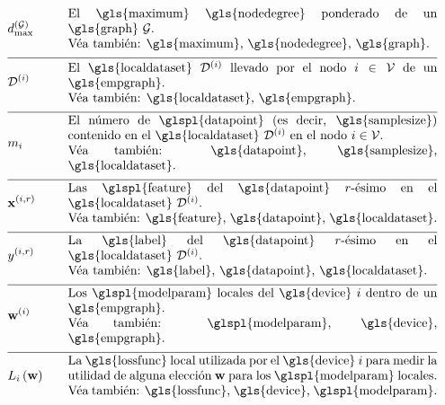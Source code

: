 \begin{align} 
   &\maxnodedegree^{(\graph)} & \quad & \parbox{.85\textwidth}{El \gls{maximum} \gls{nodedegree} ponderado de un \gls{graph} $\graph$.
	   \\ Véa también: \gls{maximum}, \gls{nodedegree}, \gls{graph}.} \nonumber \\[2mm] \hline \nonumber\\[-5mm] 
   &\localdataset{\nodeidx} & \quad & \parbox{.85\textwidth}{El \gls{localdataset} $\localdataset{\nodeidx}$ llevado por 
	   el nodo $\nodeidx\in \nodes$ de un \gls{empgraph}.
	   \\ Véa también: \gls{localdataset}, \gls{empgraph}.} \nonumber \\[2mm] \hline \nonumber\\[-5mm]
   &\localsamplesize{\nodeidx} & \quad & \parbox{.85\textwidth}{El número de \glspl{datapoint} (es decir, \gls{samplesize}) contenido en el 
	   \gls{localdataset} $\localdataset{\nodeidx}$ en el nodo $\nodeidx\in \nodes$.
	   \\ Véa también: \gls{datapoint}, \gls{samplesize}, \gls{localdataset}.} \nonumber \\[2mm] \hline \nonumber\\[-5mm]
   &\featurevec^{(\nodeidx,\sampleidx)} & \quad & \parbox{.85\textwidth}{Las \glspl{feature} del \gls{datapoint} $\sampleidx$-ésimo en 
	   el \gls{localdataset} $\localdataset{\nodeidx}$.
	   \\ Véa también: \gls{feature}, \gls{datapoint}, \gls{localdataset}.} \nonumber \\[2mm] \hline \nonumber\\[-5mm]
   &\truelabel^{(\nodeidx,\sampleidx)} & \quad & \parbox{.85\textwidth}{La \gls{label} del \gls{datapoint} $\sampleidx$-ésimo en 
	   el \gls{localdataset} $\localdataset{\nodeidx}$.
	   \\ Véa también: \gls{label}, \gls{datapoint}, \gls{localdataset}.} \nonumber \\[2mm] \hline \nonumber\\[-5mm]
   &\localparams{\nodeidx} & \quad & \parbox{.85\textwidth}{Los \glspl{modelparam} locales del \gls{device} $\nodeidx$ dentro de un \gls{empgraph}.
	   \\ Véa también: \glspl{modelparam}, \gls{device}, \gls{empgraph}.} \nonumber \\[2mm] \hline \nonumber\\[-5mm]
   &\locallossfunc{\nodeidx}{\weights} & \quad & \parbox{.85\textwidth}{La \gls{lossfunc} local utilizada por el \gls{device} $\nodeidx$ 
	   para medir la utilidad de alguna elección $\weights$ para los \glspl{modelparam} locales.
	   \\ Véa también: \gls{lossfunc}, \gls{device}, \glspl{modelparam}.} \nonumber 
\end{align} 

